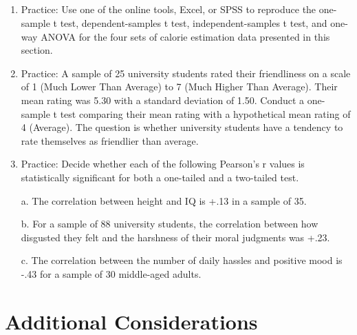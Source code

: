  

\subsection{}
\begin{fullwidth}
\begin{enumerate}
\item Practice: Use one of the online tools, Excel, or SPSS to reproduce the one-sample t test, dependent-samples t test, independent-samples t test, and one-way ANOVA for the four sets of calorie estimation data presented in this section.

\item Practice: A sample of 25 university students rated their friendliness on a scale of 1 (Much Lower Than Average) to 7 (Much Higher Than Average). Their mean rating was 5.30 with a standard deviation of 1.50. Conduct a one-sample t test comparing their mean rating with a hypothetical mean rating of 4 (Average). The question is whether university students have a tendency to rate themselves as friendlier than average.

\item Practice: Decide whether each of the following Pearson's r values is statistically significant for both a one-tailed and a two-tailed test.

a. The correlation between height and IQ is +.13 in a sample of 35.
    
b. For a sample of 88 university students, the correlation between how disgusted they felt and the harshness of their moral judgments was +.23.

c. The correlation between the number of daily hassles and positive mood is -.43 for a sample of 30 middle-aged adults.

\end{enumerate}
\end{fullwidth}  

\section{Additional Considerations}



